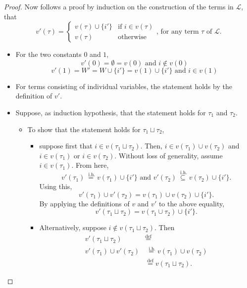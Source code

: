 \documentclass{article}
\newcommand{\lang}{\mathcal{L}}
\newcommand{\lcup}{\sqcup}
\newcommand{\eqdef}{\stackrel{\text{def}}{=}}
\newcommand{\eqih}{\stackrel{\text{ i.h.}}{=}}
\begin{document}
\begin{proof}
Now follows a proof by induction on the construction of the terms in $\lang$, that
\begin{equation*}
  v'(\tau) =
  \begin{cases}
    v(\tau) \cup \{i'\} & \text{if } i \in v(\tau) \\
    v(\tau)             & \text{otherwise}
  \end{cases}
  \text{, for any term } \tau \text{ of } \lang.
\end{equation*}
\begin{itemize}
  \item For the two constants $0$ and $1$,
    \begin{equation*}
      v'(0) = \emptyset = v(0) \text{ and } i \not \in v(0)
    \end{equation*}
    \begin{equation*}
      v'(1) = W' = W \cup \{i'\} = v(1) \cup \{i'\} \text{ and } i \in v(1)
    \end{equation*}
  \item For terms consisting of individual variables, the statement holds by the definition of $v'$.
  \item Suppose, as induction hypothesis, that the statement holds for $\tau_1$ and $\tau_2$.
    \begin{itemize}
    \item To show that the statement holds for $\tau_1 \lcup \tau_2$,
      \begin{itemize}
      \item suppose first that $i \in v(\tau_1 \lcup \tau_2)$. Then, $i \in v(\tau_1) \cup v(\tau_2)$ and $i \in v(\tau_1)$ or $i \in v(\tau_2)$. Without loss of generality, assume $i \in v(\tau_1)$. From here,
        \begin{equation*}
          v'(\tau_1) \eqih v(\tau_1) \cup \{i'\} \text{ and } v'(\tau_2) \stackrel{\text{ i.h.}}{\subseteq} v(\tau_2) \cup \{i'\}.
        \end{equation*}
        Using this,
        \begin{equation*}
          v'(\tau_1) \cup v'(\tau_2) = v(\tau_1) \cup v(\tau_2) \cup \{i'\}.
        \end{equation*}
        By applying the definitions of $v$ and $v'$ to the above equality,
        \begin{equation*}
          v'(\tau_1 \lcup \tau_2) = v(\tau_1 \cup \tau_2) \cup \{i'\}.
        \end{equation*}


      \item Alternatively, suppose $i \not \in v(\tau_1 \lcup \tau_2)$. Then
        \begin{align*}
          v'(\tau_1 \lcup \tau_2) &\eqdef \\
          v'(\tau_1) \cup v'(\tau_2) &\eqih v(\tau_1) \cup v(\tau_2) \\
          &\eqdef v(\tau_1 \lcup \tau_2).
        \end{align*}
      \end{itemize}


\end{itemize}
\end{itemize}
\end{proof}
\end{document}
